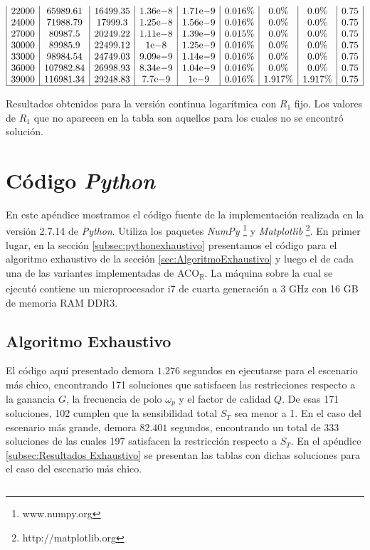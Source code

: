 \documentclass{llncs}
\newcommand{\expnumber}[2]{{#1}\mathrm{e}{#2}}
\begin{document}
\begin{table}[H]
$$\begin{array}{|c|c|c|c|c|c|c|c|c|c|}
			22000 & 65989.61 & 16499.35 & \expnumber{1.36}{-8} & \expnumber{1.71}{-9} & 0.016\% & 0.0\% & 0.0\% & 0.75 \\
			24000 & 71988.79 & 17999.3 & \expnumber{1.25}{-8} & \expnumber{1.56}{-9} & 0.016\% & 0.0\% & 0.0\% & 0.75 \\
			27000 & 80987.5 & 20249.22 & \expnumber{1.11}{-8} & \expnumber{1.39}{-9} & 0.015\% & 0.0\% & 0.0\% & 0.75 \\
			30000 & 89985.9 & 22499.12 & \expnumber{1}{-8} & \expnumber{1.25}{-9} & 0.016\% & 0.0\% & 0.0\% & 0.75 \\
			33000 & 98984.54 & 24749.03 & \expnumber{9.09}{-9} & \expnumber{1.14}{-9} & 0.016\% & 0.0\% & 0.0\% & 0.75 \\
			36000 & 107982.84 & 26998.93 & \expnumber{8.34}{-9} & \expnumber{1.04}{-9} & 0.016\% & 0.0\% & 0.0\% & 0.75 \\
			39000 & 116981.34 & 29248.83 & \expnumber{7.7}{-9} & \expnumber{1}{-9} & 0.016\% & 1.917\% & 1.917\% & 0.75 \\
			\hline
			\end{array}
			$$
			\caption{Resultados obtenidos para la versión continua logarítmica con $R_1$ fijo. Los valores de $R_1$ que no aparecen en la tabla son
			aquellos para los cuales no se encontró solución.}
			\label{cuadroResultadosContinuoFijo}
		\end{table}
	
	
	\section{\textbf{Código \textit{Python}}}
	En este apéndice mostramos el código fuente de la implementación realizada en la versión 2.7.14 de \textit{Python}. Utiliza los
	paquetes \textit{NumPy} \footnote{www.numpy.org} y \textit{Matplotlib} \footnote{http://matplotlib.org}. 
	En primer lugar, en la sección \ref{subsec:pythonexhaustivo} presentamos el código para el algoritmo exhaustivo de la sección
	\ref{sec:AlgoritmoExhaustivo} y luego el de cada una de las variantes implementadas de ACO\textsubscript{$\mathbb{R}$}.
	La máquina sobre la cual se ejecutó contiene un microprocesador i7 de cuarta generación a 3 GHz con 16 GB de memoria RAM DDR3.
	\subsection{Algoritmo Exhaustivo}
	El código aquí presentado demora $1.276$ segundos en ejecutarse para el escenario más chico, encontrando 171 soluciones que satisfacen
	las restricciones respecto a la ganancia $G$, la frecuencia de polo $\omega_p$ y el factor de calidad $Q$. De esas 171 soluciones, 102
	cumplen que la sensibilidad total $S_T$ sea menor a 1. En el caso del escenario más grande, demora $82.401$ segundos, encontrando
	un total de 333 soluciones de las cuales 197 satisfacen la restricción respecto a $S_T$. En el apéndice \ref{subsec:Resultados Exhaustivo} 
	se presentan las tablas con dichas soluciones para el caso del escenario más chico.
	\label{subsec:pythonexhaustivo}
	\inputminted{python}{exhaustivo.py}
\end{document}
